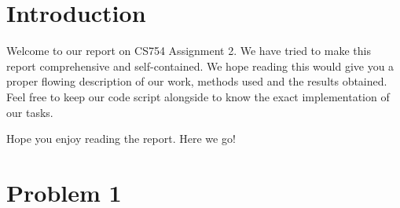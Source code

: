 \documentclass[a4paper,11pt]{article}
\numberwithin{definition}{section}
\numberwithin{mytheorem}{subsection}
\begin{document}

\date{Spring 2022}
\maketitle

\justifying
\tableofcontents

\newpage
\justifying
\section*{Introduction}

Welcome  to our report on CS754 Assignment 2. We have tried to make this report comprehensive and self-contained. We hope reading this would give you a proper flowing description of our work, methods used and the results obtained. Feel free to keep our code script alongside to know the exact implementation of our tasks. 

Hope you enjoy reading the report. Here we go!


\section{Problem 1}
\end{document}
